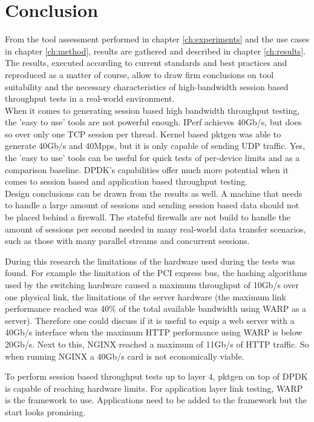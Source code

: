 \chapter{Conclusion}\label{ch:conclusion}
From the tool assessment performed in chapter \ref{ch:experiments} and the use cases in chapter \ref{ch:method}, results are gathered and described in chapter \ref{ch:results}.
The results, executed according to current standards and best practices and reproduced as a matter of course, allow to draw firm conclusions on tool suitability and the necessary characteristics of high-bandwidth session based throughput tests in a real-world environment. \\
When it comes to generating session based high bandwidth throughput testing, the 'easy to use' tools are not powerful enough. IPerf achieves 40Gb/s, but does so over only one TCP session per thread. 
Kernel based pktgen was able to generate 40Gb/s and 40Mpps, but it is only capable of sending UDP traffic. 
Yes, the 'easy to use' tools can be useful for quick tests of per-device limits and as a comparison baseline.
DPDK's capabilities offer much more potential when it comes to session based and application based throughput testing. \\ 

Design conclusions can be drawn from the results as well. A machine that needs to handle a large amount of sessions and sending session based data should not be placed behind a firewall.
The stateful firewalls are not build to handle the amount of sessions per second needed in many real-world data transfer scenarios, such as those with many parallel streams and concurrent sessions.  

During this research the limitations of the hardware used during the tests was found. For example the limitation of the PCI express bus, the hashing algorithms used by the switching hardware caused a maximum throughput of 10Gb/s over one physical link, the limitations of the server hardware (the maximum link performance reached was 40\% of the total available bandwidth using WARP as a server). Therefore one could discuss if it is useful to equip a web server with a 40Gb/s interface when the maximum HTTP performance using WARP is below 20Gb/s.
Next to this, NGINX reached a maximum of 11Gb/s of HTTP traffic. So when running NGINX a 40Gb/s card is not economically viable. 

To perform session based throughput tests up to layer 4, pktgen on top of DPDK is capable of reaching hardware limits.
For application layer link testing, WARP is the framework to use. Applications need to be added to the framework but the start looks promising.

